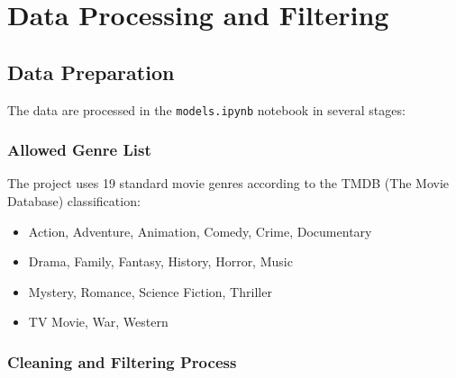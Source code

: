 \documentclass[12pt,a4paper]{article}
\begin{document}
\section{Data Processing and Filtering}

\subsection{Data Preparation}

The data are processed in the \texttt{models.ipynb} notebook in several stages:

\subsubsection{Allowed Genre List}

The project uses 19 standard movie genres according to the TMDB (The Movie Database) classification:

\begin{itemize}

    \item Action, Adventure, Animation, Comedy, Crime, Documentary

    \item Drama, Family, Fantasy, History, Horror, Music

    \item Mystery, Romance, Science Fiction, Thriller

    \item TV Movie, War, Western

\end{itemize}

\subsubsection{Cleaning and Filtering Process}
\end{document}
